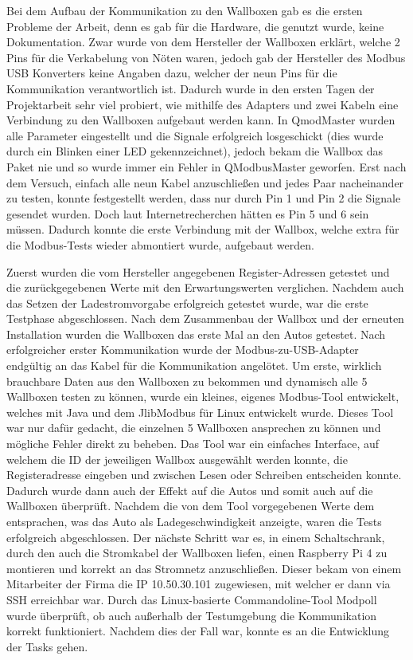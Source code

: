 Bei dem Aufbau der Kommunikation zu den Wallboxen gab es die ersten Probleme der Arbeit, denn es gab für die Hardware, die genutzt wurde, keine Dokumentation. Zwar wurde von dem Hersteller der Wallboxen erklärt, welche 2 Pins für die Verkabelung von Nöten waren, jedoch gab der Hersteller des Modbus USB Konverters keine Angaben dazu, welcher der neun Pins für die Kommunikation verantwortlich ist. Dadurch wurde in den ersten Tagen der Projektarbeit sehr viel probiert, wie mithilfe des Adapters und zwei Kabeln eine Verbindung zu den Wallboxen aufgebaut werden kann. In QmodMaster wurden alle Parameter eingestellt und die Signale erfolgreich losgeschickt (dies wurde durch ein Blinken einer LED gekennzeichnet), jedoch bekam die Wallbox das Paket nie und so wurde immer ein Fehler in QModbusMaster geworfen. Erst nach dem Versuch, einfach alle neun Kabel anzuschließen und jedes Paar nacheinander zu testen, konnte festgestellt werden, dass nur durch Pin 1 und Pin 2 die Signale gesendet wurden. Doch laut Internetrecherchen hätten es Pin 5 und 6 sein müssen. Dadurch konnte die erste Verbindung mit der Wallbox, welche extra für die Modbus-Tests wieder abmontiert wurde, aufgebaut werden.




Zuerst wurden die vom Hersteller angegebenen Register-Adressen getestet und die zurückgegebenen Werte mit den Erwartungswerten verglichen. Nachdem auch das Setzen der Ladestromvorgabe erfolgreich getestet wurde, war die erste Testphase abgeschlossen. Nach dem Zusammenbau der Wallbox und der erneuten Installation wurden die Wallboxen das erste Mal an den Autos getestet. Nach erfolgreicher erster Kommunikation wurde der Modbus-zu-USB-Adapter endgültig an das Kabel für die Kommunikation angelötet. Um erste, wirklich brauchbare Daten aus den Wallboxen zu bekommen und dynamisch alle 5 Wallboxen testen zu können, wurde ein kleines, eigenes Modbus-Tool entwickelt, welches mit Java und dem JlibModbus für Linux entwickelt wurde. Dieses Tool war nur dafür gedacht, die einzelnen 5 Wallboxen ansprechen zu können und mögliche Fehler direkt zu beheben. Das Tool war ein einfaches Interface, auf welchem die ID der jeweiligen Wallbox ausgewählt werden konnte, die Registeradresse eingeben und zwischen Lesen oder Schreiben entscheiden konnte. Dadurch wurde dann auch der Effekt auf die Autos und somit auch auf die Wallboxen überprüft. Nachdem die von dem Tool vorgegebenen Werte dem entsprachen, was das Auto als Ladegeschwindigkeit anzeigte, waren die Tests erfolgreich abgeschlossen. Der nächste Schritt war es, in einem Schaltschrank, durch den auch die Stromkabel der Wallboxen liefen, einen Raspberry Pi 4 zu montieren und korrekt an das Stromnetz anzuschließen. Dieser bekam von einem Mitarbeiter der Firma die IP 10.50.30.101 zugewiesen, mit welcher er dann via SSH erreichbar war. Durch das Linux-basierte Commandoline-Tool Modpoll wurde überprüft, ob auch außerhalb der Testumgebung die Kommunikation korrekt funktioniert. Nachdem dies der Fall war, konnte es an die Entwicklung der Tasks gehen.


